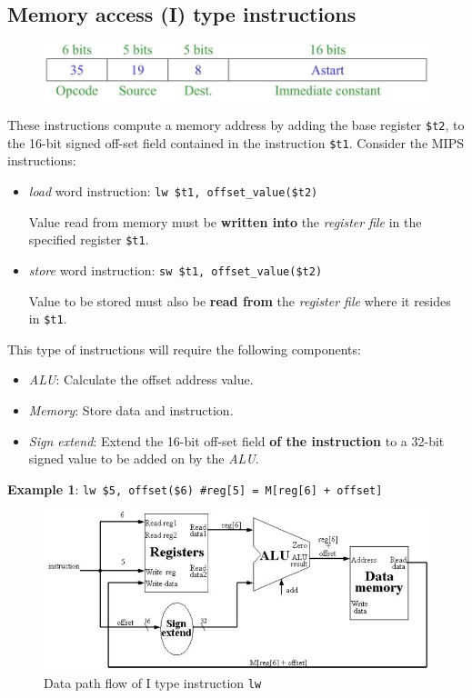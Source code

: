 \documentclass[10pt,a4paper]{article}
\begin{document}
\pagebreak
\subsection{Memory access (I) type instructions}

\begin{figure} [h!]
    \centering
    \includegraphics[scale=0.5]{I type.JPG}
\end{figure}

These instructions compute a memory address by adding the base register \texttt{\$t2}, to the 16-bit
signed off-set field contained in the instruction \texttt{\$t1}. Consider the MIPS instructions:
\begin{itemize}
    \item \textit{load} word instruction: \texttt{lw \$t1, offset\_value(\$t2)}
    
    Value read from memory must be \textbf{written into} the \textit{register file} in the specified register \texttt{\$t1}.
    \item \textit{store} word instruction: \texttt{sw \$t1, offset\_value(\$t2)}
    
    Value to be stored must also be \textbf{read from} the \textit{register file} where it resides in \texttt{\$t1}.
\end{itemize}

This type of instructions will require the following components:
\begin{itemize}
    \item \textit{ALU}: Calculate the offset address value.
    \item \textit{Memory}: Store data and instruction.
    \item \textit{Sign extend}: Extend the 16-bit off-set field \textbf{of the instruction} to a
    32-bit signed value to be added on by the \textit{ALU}.
\end{itemize}

\textbf{Example 1}: \texttt{lw \$5, offset(\$6) \#reg[5] = M[reg[6] + offset] }
\begin{figure} [h!]
    \centering
    \includegraphics[scale=0.8]{I type example 1.JPG}
    \caption{Data path flow of I type instruction \texttt{lw}}
\end{figure}
\end{document}
